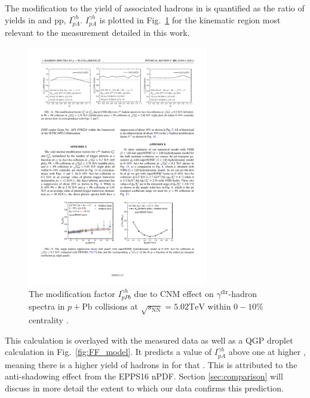 {The modification to the yield of associated hadrons in \pPb is quantified as the ratio of yields in \pPb and pp, $I_{pA}^{\gamma h}$. $I_{pA}^{\gamma h}$ is plotted in Fig.~\ref{fig:cnm_Iaa} for the kinematic region most relevant to the measurement detailed in this work.
\begin{figure}[htpb]
  \centering
  \includegraphics[width=0.7\textwidth]{cnm_Iaa}
  \caption{The modification factor $I_{p P b}^{\gamma h}$ due to CNM effect on $\gamma^{\text {dir}}$-hadron spectra in $p+\mathrm{Pb}$ collisions at $\sqrt{s_{\mathrm{NN}}}=5.02 \mathrm{TeV}$ within $0-10 \%$ centrality \cite{Xie2021}.}
  \label{fig:cnm_Iaa}
\end{figure} 

This calculation is overlayed with the measured data as well as a QGP droplet calculation in Fig.~\ref{fig:FF_model}. It predicts a value of $I_{pA}^{\gamma h}$ above one at higher \zt, meaning there is a higher yield of hadrons in \pPb for that \zt. This is attributed to the anti-shadowing effect from the EPPS16 nPDF. Section \ref{sec:comparison} will discuss in more detail the extent to which our data confirms this prediction. 

}
